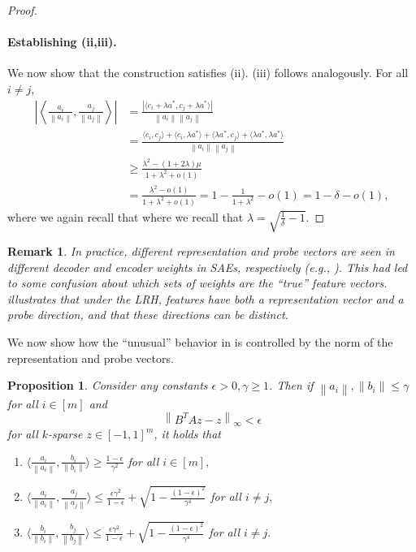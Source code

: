 \documentclass[11pt]{article}
\newtheorem{proposition}[theorem]{Proposition}
\newtheorem{remark}[theorem]{Remark}
\newcommand{\norm}[1]{\left\|#1\right\|}
\begin{document}
\begin{proof}
    \paragraph{Establishing (ii,iii).} We now show that the construction satisfies (ii). (iii) follows analogously. For all $i\neq j$,
     \begin{align}
        \left|\left\langle \frac{a_i}{\norm{a_i}}, \frac{a_j}{\norm{a_j}} \right\rangle\right|
        &= \frac{|\langle c_i + \lambda a^*, c_j + \lambda a^*\rangle|}{\norm{a_i}\norm{a_j}}\\
        &= \frac{\langle c_i, c_j\rangle + \langle c_i, \lambda a^*\rangle + \langle \lambda a^*, c_j \rangle + \langle \lambda a^*, \lambda a^* \rangle}{\norm{a_i}\norm{a_j}}\\
        &\ge \frac{\lambda^2 - (1 + 2\lambda)\mu}{1 + \lambda^2 + o(1)}\\
        &= \frac{\lambda^2 - o(1)}{1 + \lambda^2 + o(1)} = 1 - \frac{1}{1 + \lambda^2} - o(1) = 1 - \delta - o(1),
    \end{align}
    where we again recall that where we recall that $\lambda = \sqrt{\frac{1}{\delta} - 1}.$
    
\end{proof}

\begin{remark}
    In practice, different representation and probe vectors are seen in different decoder and encoder weights in SAEs, respectively (e.g., \citep{templeton2024scaling, paulo2025sparse}). This had led to some confusion about which sets of weights are the ``true'' feature vectors.  illustrates that under the LRH, features have both a representation vector and a probe direction, and that these directions can be \textit{distinct}.
\end{remark}

We now show how the ``unusual'' behavior in  is controlled by the norm of the representation and probe vectors.

\begin{proposition}\label{prop:geometry-2}
    Consider any constants $\epsilon > 0, \gamma \ge 1$. Then if $\norm{a_i},\norm{b_i} \le \gamma$ for all $i\in [m]$ and
    \begin{equation}
        \norm{B^TAz - z}_\infty < \epsilon
    \end{equation}
    for all $k$-sparse $z\in [-1,1]^m$, it holds that
    \begin{enumerate}
        \item[(i)] $\langle \frac{a_i}{\norm{a_i}}, \frac{b_i}{\norm{b_i}}\rangle \ge \frac{1-\epsilon}{\gamma^2}$ for all $i\in [m],$
        \item[(ii)] $\langle \frac{a_i}{\norm{a_i}}, \frac{a_j}{\norm{a_j}}\rangle \le \frac{\epsilon\gamma^2}{1 - \epsilon} + \sqrt{1 - \frac{(1 - \epsilon)^2}{\gamma^4}}$ for all $i\neq j,$
        \item[(iii)] $\langle \frac{b_i}{\norm{b_i}}, \frac{b_j}{\norm{b_j}}\rangle \le \frac{\epsilon\gamma^2}{1 - \epsilon} + \sqrt{1 - \frac{(1 - \epsilon)^2}{\gamma^4}}$ for all $i\neq j.$
    \end{enumerate}
\end{proposition}
\end{document}
